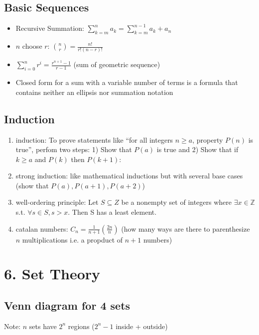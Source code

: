\documentclass[8pt,landscape]{article}
\begin{document}
\begin{multicols*}{4}
		\subsection*{Basic Sequences}
		\begin{itemize}[leftmargin=*]
			\item Recursive Summation: $\sum_{k=m}^n a_k = \sum_{k=m}^{n-1} a_k + a_n$
			\item $n$ choose $r$: $\binom{n}{r} = \frac{n!}{r!(n-r)!}$
			\item $\sum_{i=0}^n r^i = \frac{r^{n+1}-1}{r-1}$ (sum of geometric sequence)
			\item Closed form for a sum with a variable number of terms is a formula that contains neither an ellipsis nor summation notation
		\end{itemize}
		
		\subsection*{Induction}
		\begin{enumerate}[leftmargin=*]
			\item induction: To prove statements like “for all integers $n\geq a$, property $P(n)$ is true”, perfom two steps: 1) Show that $P(a)$ is true and 2) Show that if $k \geq a$ and $P(k)$ then $P(k + 1)$:
			\item strong induction: like mathematical inductions but with several base cases (show that $P(a),P(a+1),P(a+2)$)
			\item well-ordering principle: Let $S\subseteq Z$ be a nonempty set of integers where $\exists x \in \mathbb{Z}$ s.t. $\forall s \in S, s > x$. Then S has a least element.
			\item catalan numbers: $C_n=\frac{1}{n+1}\left(\frac{2n}{n}\right)$ (how many ways are there to parenthesize $n$ multiplications i.e. a propduct of $n+1$ numbers)
		\end{enumerate}
		
		\section*{6. Set Theory}
		\subsection*{Venn diagram for 4 sets}
			Note: $n$ sets have $2^n$ regions ($2^n-1$ inside + outside)\\
	\begin{tikzpicture}[set/.style={fill=cyan,fill opacity=0.1}]
		

\end{tikzpicture}
\end{multicols*}
\end{document}
